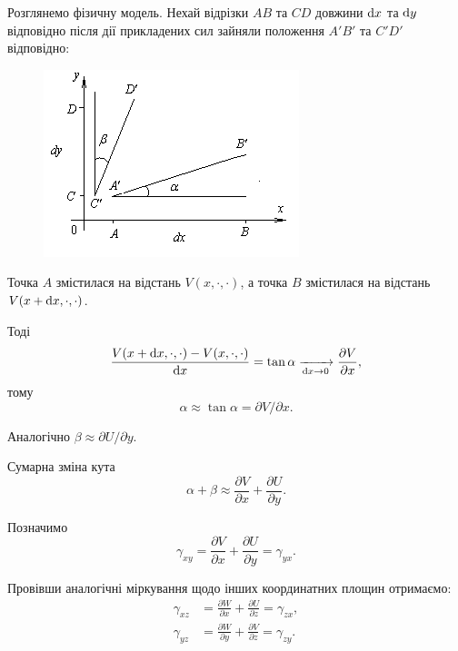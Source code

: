 \begin{enumerate}
	Розглянемо фізичну модель. Нехай відрізки $AB$ та $CD$ довжини $\mathop{}\!\mathrm{d} x$ та $\mathop{}\!\mathrm{d} y$  відповідно після дії прикладених сил зайняли положення $A' B'$ та $C' D'$ відповідно:
	\begin{figure}[H]
		\centering
		\includegraphics[]{img/8-4.png}
	\end{figure}

	Точка $A$ змістилася на відстань $V(x, \cdot, \cdot)$, а точка $B$ змістилася на відстань $V(x + \mathop{}\!\mathrm{d} x, \cdot, \cdot)$. \medskip

	Тоді
	\begin{equation}
		\frac{V(x + \mathop{}\!\mathrm{d} x, \cdot, \cdot) -V(x, \cdot, \cdot)}{\mathop{}\!\mathrm{d} x} = \tan \alpha \xrightarrow[\mathop{}\!\mathrm{d} x \to 0]{} \frac{\partial V}{\partial x},
	\end{equation}
	тому
	\begin{equation}
		\alpha \approx \tan \alpha = \partial V / \partial x.
	\end{equation}

	Аналогічно $\beta \approx \partial U / \partial y$. \medskip

	Сумарна зміна кута
	\begin{equation}
		\alpha + \beta \approx \frac{\partial V}{\partial x} + \frac{\partial U}{\partial y}.
	\end{equation}
	
	Позначимо
	\begin{equation}
		\gamma_{x y} = \frac{\partial V}{\partial x} + \frac{\partial U}{\partial y} = \gamma_{y x}.
	\end{equation}
	
	Провівши аналогічні міркування щодо інших координатних площин отримаємо: 
	\begin{align}
		\gamma_{x z} &= \frac{\partial W}{\partial x} + \frac{\partial U}{\partial z} = \gamma_{z x}, \\
		\gamma_{y z} &= \frac{\partial W}{\partial y} + \frac{\partial V}{\partial z} = \gamma_{z y}.
	\end{align}


\end{enumerate}
